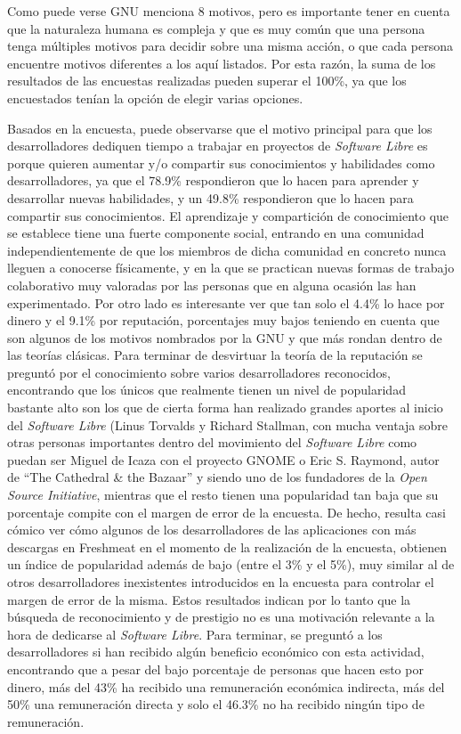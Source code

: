 Como puede verse GNU menciona 8 motivos, pero es importante tener en cuenta que la naturaleza humana es compleja y que es muy común que una persona tenga múltiples motivos para decidir sobre una misma acción, o que cada persona encuentre motivos diferentes a los aquí listados. Por esta razón, la suma de los resultados de las encuestas realizadas pueden superar el 100\%, ya que los encuestados tenían la opción de elegir varias opciones.

Basados en la encuesta, puede observarse que el motivo principal para que los desarrolladores dediquen tiempo a trabajar en proyectos de \textit{Software Libre} es porque quieren aumentar y/o compartir sus conocimientos y habilidades como desarrolladores, ya que el 78.9\% respondieron que lo hacen para aprender y desarrollar nuevas habilidades, y un 49.8\% respondieron que lo hacen para compartir sus conocimientos.
El aprendizaje y compartición de conocimiento que se establece tiene una fuerte componente social, entrando en una comunidad independientemente de que los miembros de dicha comunidad en concreto nunca lleguen a conocerse físicamente, y en la que se practican nuevas formas de trabajo colaborativo muy valoradas por las personas que en alguna ocasión las han experimentado.
Por otro lado es interesante ver que tan solo el 4.4\% lo hace por dinero y el 9.1\% por reputación, porcentajes muy bajos teniendo en cuenta que son algunos de los motivos nombrados por la GNU y que más rondan dentro de las teorías clásicas.
Para terminar de desvirtuar la teoría de la reputación se preguntó por el conocimiento sobre varios desarrolladores reconocidos, encontrando que los únicos que realmente tienen un nivel de popularidad bastante alto son los que de cierta forma han realizado grandes aportes al inicio del \textit{Software Libre} (Linus Torvalds y Richard Stallman, con mucha ventaja sobre otras personas importantes dentro del movimiento del \textit{Software Libre} como puedan ser Miguel de Icaza con el proyecto GNOME o Eric S. Raymond, autor de ``The Cathedral & the Bazaar'' y siendo uno de los fundadores de la \textit{Open Source Initiative}, mientras que el resto tienen una popularidad tan baja que su porcentaje compite con el margen de error de la encuesta. De hecho, resulta casi cómico ver cómo algunos de los desarrolladores de las aplicaciones con más descargas en Freshmeat en el momento de la realización de la encuesta, obtienen un índice de popularidad además de bajo (entre el 3\% y el 5\%), muy similar al de otros desarrolladores inexistentes introducidos en la encuesta para controlar el margen de error de la misma. Estos resultados indican por lo tanto que la búsqueda de reconocimiento y de prestigio no es una motivación relevante a la hora de dedicarse al \textit{Software Libre}.
Para terminar, se preguntó a los desarrolladores si han recibido algún beneficio económico con esta actividad, encontrando que a pesar del bajo porcentaje de personas que hacen esto por dinero, más del 43\% ha recibido una remuneración económica indirecta, más del 50\% una remuneración directa y solo el 46.3\% no ha recibido ningún tipo de remuneración.

